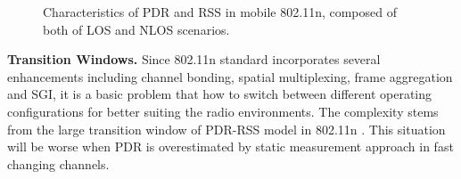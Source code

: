 \documentclass[draftclsnofoot,journal,onecolumn,11pt]{IEEEtran}
\begin{document}
\begin{figure}[!t]
\centerline{
}
\caption{Characteristics of PDR and RSS in mobile 802.11n, composed of both of LOS and NLOS scenarios.}
\label{time}
\end{figure}

\textbf{Transition Windows.} Since 802.11n standard incorporates several enhancements including channel bonding, spatial multiplexing, frame aggregation and SGI, it is a basic problem that how to switch between different operating configurations for better suiting the radio environments. The complexity stems from the large transition window of PDR-RSS model in 802.11n \cite{Halperin2010predictable}. This situation will be worse when PDR is overestimated by static measurement approach in fast changing channels. 
\end{document}
